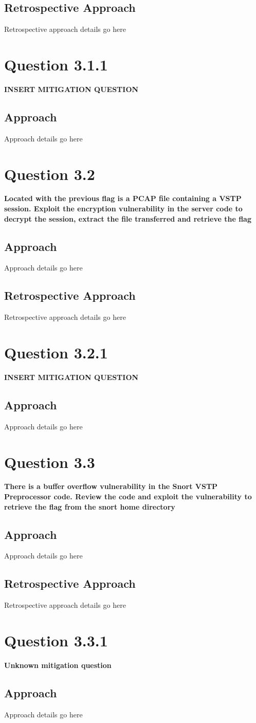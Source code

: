 \subsection{Retrospective Approach}
Retrospective approach details go here

\section{Question 3.1.1}
\textbf{INSERT MITIGATION QUESTION}
\subsection{Approach}
Approach details go here

\section{Question 3.2}
\textbf{Located with the previous flag is a PCAP file containing a VSTP session.
Exploit the encryption vulnerability in the server code to decrypt the session,
extract the file transferred and retrieve the flag}
\subsection{Approach}
Approach details go here
\subsection{Retrospective Approach}
Retrospective approach details go here

\section{Question 3.2.1}
\textbf{INSERT MITIGATION QUESTION}
\subsection{Approach}
Approach details go here

\section{Question 3.3}
\textbf{There is a buffer overflow vulnerability in the Snort VSTP Preprocessor
code. Review the code and exploit the vulnerability to retrieve the flag from
the snort home directory}
\subsection{Approach}
Approach details go here
\subsection{Retrospective Approach}
Retrospective approach details go here

\section{Question 3.3.1}
\textbf{Unknown mitigation question}
\subsection{Approach}
Approach details go here

